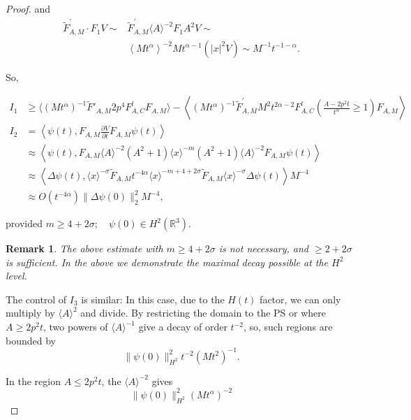 \documentclass[10pt,a4paper]{amsart}
\newtheorem{remark}[theorem]{Remark}
\begin{document}
\begin{proof}
and
$$
\begin{aligned}
\tilde{F}_{A, M}^{\prime} \cdot F_{1} V \sim & \tilde{F}_{A, M}^{\prime}\langle A\rangle^{-2} F_{1} A^{2} V \sim \\
& \left\langle M t^{\alpha}\right\rangle^{-2} M t^{\alpha-1}\left( |x|^{2} V\right) \sim M^{-1} t^{-1-\alpha}.
\end{aligned}
$$

So,

\begin{align*}
I_{1} &\geqslant\langle (Mt^{\alpha})^{-1}\tilde F'_{A,M}2p^4 F_{A,C}^lF_{A,M}\rangle-\left\langle\left(M t^{\alpha}\right)^{-1} \tilde F_{A, M}^{'} M^{2} t^{2 \alpha-2} F_{A, C}^l\left(\frac{A-2 p^{2} t}{t^{\alpha}} \geqslant 1\right) F_{A, M}\right\rangle \\
I_{2} & =\left\langle\psi(t), F_{A, M} \frac{\partial V}{\partial t} F_{A, M} \psi(t)\right\rangle  \tag{C.7}\\
& \approx\left\langle\psi(t), F_{A, M}\langle A\rangle^{-2}\left(A^{2}+1\right)\langle x\rangle^{-m}\left(A^{2}+1\right)\langle A\rangle^{-2} F_{A, M} \psi(t)\right\rangle  \tag{C.8}\\
& \approx\left\langle\Delta \psi(t),\langle x\rangle^{-\sigma} \tilde{F}_{A,M} t^{-4 \alpha}\langle x\rangle^{-m+4+2 \sigma} \tilde{F}_{A, M}\langle x\rangle^{-\sigma} \Delta \psi(t)\right\rangle M^{-4} \\
& \approx O\left(t^{-4 \alpha}\right)\|\Delta \psi(0)\|_{2}^{2} M^{-4},
\end{align*}

provided $m \geqslant 4+2 \sigma ; \quad \psi(0) \in H^{2}\left(\mathbb{R}^{3}\right)$.
\begin{remark}
The above estimate with $m\geqslant 4+2 \sigma$ is not necessary, and $\geqslant 2+2 \sigma$ is sufficient.
In the above we demonstrate the maximal decay possible at the $H^2$ level.
\end{remark}

The control of  $I_3$ is similar:
In this case, due to the $H(t)$ factor, we can only multiply by $\langle A\rangle^{2}$ and divide.
By restricting the domain to the PS or where
$A \geqslant 2 p^{2} t$, two powers of $\langle A\rangle ^{-1}$ give a decay of order $t^{-2}$, so, such regions are bounded by
$$
\|\psi(0)\|_{H^{2}}^{2} t^{-2}\left(M t^{2}\right)^{-1} .
$$

In the region $A \leq 2 p^{2} t$, the $\langle A\rangle^{-2}$ gives
$$
\|\psi(0)\|_{H^{2}}^{2}\left(M t^{\alpha}\right)^{-2}
$$


\end{proof}
\end{document}
